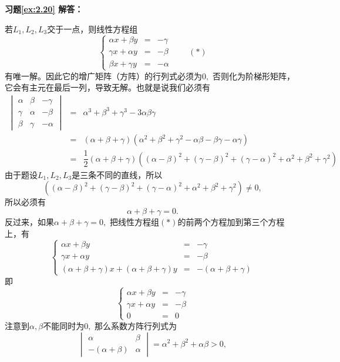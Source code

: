 \vspace{1.5em}

\textbf{习题\ref{ex:2.20} 解答：}

若$L_1, L_2, L_3$交于一点，则线性方程组
$$\left\{ \begin{array}{rcl} \alpha x + \beta y & = & -\gamma \\ \gamma x + \alpha y & = & -\beta \\ \beta x + \gamma y & = & -\alpha \end{array}\right. \qquad (\ast)$$
有唯一解。因此它的增广矩阵（方阵）的行列式必须为$0,$ 否则化为阶梯形矩阵，它会有主元在最后一列，导致无解。也就是说我们必须有
\begin{eqnarray*}
\begin{vmatrix}
\alpha & \beta & -\gamma \\ \gamma & \alpha & -\beta \\ \beta & \gamma & -\alpha \end{vmatrix} & = & \alpha^3 + \beta^3 + \gamma^3 - 3\alpha\beta\gamma \\
& = & (\alpha + \beta + \gamma)(\alpha^2 + \beta^2 + \gamma^2 - \alpha\beta - \beta\gamma - \alpha\gamma) \\
& = & \dfrac{1}{2}(\alpha + \beta + \gamma)((\alpha - \beta)^2 + (\gamma - \beta)^2 + (\gamma - \alpha)^2 + \alpha^2 + \beta^2 + \gamma^2)
\end{eqnarray*}
由于题设$L_1, L_2, L_3$是三条不同的直线，所以
$$((\alpha - \beta)^2 + (\gamma - \beta)^2 + (\gamma - \alpha)^2 + \alpha^2 + \beta^2 + \gamma^2)\neq 0,$$
所以必须有
$$\alpha + \beta + \gamma = 0.$$
反过来，如果$\alpha + \beta + \gamma = 0,$ 把线性方程组$(\ast)$的前两个方程加到第三个方程上，有
$$\left\{ \begin{array}{rcl} \alpha x + \beta y & = & -\gamma \\ \gamma x + \alpha y & = & -\beta \\ (\alpha + \beta + \gamma) x + (\alpha + \beta + \gamma) y & = & -(\alpha + \beta + \gamma) \end{array}\right.$$
即
$$\left\{ \begin{array}{rcl} \alpha x + \beta y & = & -\gamma \\ \gamma x + \alpha y & = & -\beta \\ 0 & = & 0 \end{array}\right.$$
注意到$\alpha,\beta$不能同时为$0,$ 那么系数方阵行列式为
$$\begin{vmatrix}
\alpha & \beta \\ -(\alpha+\beta) & \alpha \end{vmatrix} = \alpha^2 + \beta^2 + \alpha\beta >0,$$
